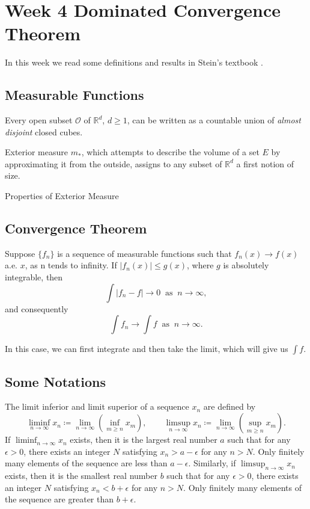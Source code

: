 \section{Week 4 Dominated Convergence Theorem}

In this week we read some definitions and results in Stein's textbook \cite{stein2009real}.

\subsection{Measurable Functions}
\begin{Theorem}
    Every open subset $\mathcal O$ of $\mathbb R^d$, $d \geq 1$, can be written as a countable union of \textit{almost disjoint} closed cubes.
\end{Theorem}

Exterior measure $m_{\ast}$, which attempts to describe the volume of a set $E$ by approximating it from the outside, assigns to any subset of $\mathbb R^d$ a first notion of size.

Properties of Exterior Measure

\subsection{Convergence Theorem}
\begin{Theorem}\label{thm_dominated}
    Suppose $\{f_n\}$ is a sequence of measurable functions such that $f_n(x) \to f(x)$ a.e. $x$, as n tends to infinity. If $\vert f_n(x)\vert \leq g(x)$, where $g$ is absolutely integrable, then
    \[\int \vert f_n-f\vert \to 0 ~\text{ as }~ n\to \infty,\]
    and consequently
    \[\int f_n\to \int f ~\text{ as }~ n\to \infty.\]
\end{Theorem}



In this case, we can first integrate and then take the limit, which will give us $\int f$.


\subsection{Some Notations}
The limit inferior and limit superior of a sequence ${x_n}$ are defined by
\[
\liminf_{n \rightarrow \infty} x_n \coloneqq \lim_{n \rightarrow \infty}(\inf_{m \geq n} x_m),
\qquad 
\limsup_{n \rightarrow \infty} x_n \coloneqq \lim_{n \rightarrow \infty}(\sup_{m \geq n} x_m).
\]
If $\liminf_{n \rightarrow \infty} x_n$ exists, then it is the largest real number $a$ such that for any $\epsilon > 0$, there exists an integer $N$ satisfying $x_n > a - \epsilon$ for any $n > N$.
Only finitely many elements of the sequence are less than $a - \epsilon$.
Similarly, if $\limsup_{n \rightarrow \infty} x_n$ exists, then it is the smallest real number $b$ such that for any $\epsilon > 0$, there exists an integer $N$ satisfying $x_n < b + \epsilon$ for any $n > N$.
Only finitely many elements of the sequence are greater than $b + \epsilon$.
